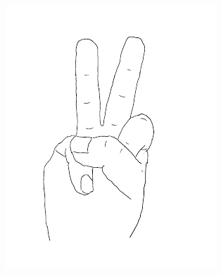 \documentclass[12pt, a4paper, oneside]{ctexart}
\begin{document}
\begin{figure}[H]
{\begin{minipage}[t]{0.33\linewidth}
        \includegraphics[width=\linewidth]{fig/marked2.pdf}
        \end{minipage}%
        \label{fig:marked2}%
    }%


\end{figure}
\end{document}
